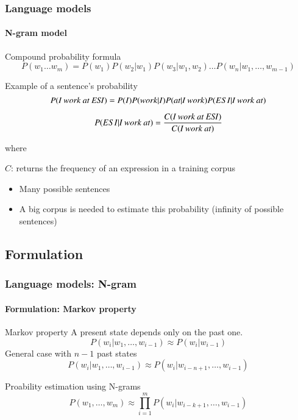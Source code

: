 \documentclass[xcolor=table]{beamer}
\begin{document}
\begin{frame}
\frametitle{Language models}
\framesubtitle{N-gram model}

\begin{block}{Compound probability formula}
	\[ P(w_1 \ldots w_m) =  P(w_1) P(w_2 | w_1) P(w_3 | w_1, w_2) \ldots P(w_n | w_1, \ldots, w_{m-1}) \]
\end{block}


\begin{exampleblock}{Example of a sentence's probability}
	\[ P(\text{\textit{I work at ESI}}) =  P(I) P(work | I) P(\text{\textit{at}} | \text{\textit{I work}}) P(ESI | \text{\textit{I work at}}) \]
	
	\[ P(ESI | \text{\textit{I work at}}) = \frac{C(\text{\textit{I work at ESI}})}{C( \text{\textit{I work at}})} \] 
	
	where 
	
	$C$: returns the frequency of an expression in a training corpus
\end{exampleblock}

\begin{itemize}
	\item Many possible sentences
	\item A big corpus is needed to estimate this probability (infinity of possible sentences)
\end{itemize}

\end{frame}

\subsection{Formulation}

\begin{frame}
\frametitle{Language models: N-gram}
\framesubtitle{Formulation: Markov property}

\begin{block}{Markov property}
	A present state depends only on the past one. 
	\[%
	P(w_i | w_1,\ldots, w_{i-1}) \approx P(w_i | w_{i-1})
	\]
	General case with $n-1$ past states
	\[%
	P(w_i | w_1,\ldots, w_{i-1}) \approx P(w_i | w_{i-n+1}, \ldots, w_{i-1})
	\]
\end{block}

\begin{block}{Proability estimation using N-grams}
	\[
	P(w_1,\ldots, w_{m}) \approx \prod_{i=1}^m P(w_i | w_{i-k+1}, \ldots, w_{i-1})
	\]
\end{block}

\end{frame}
\end{document}
